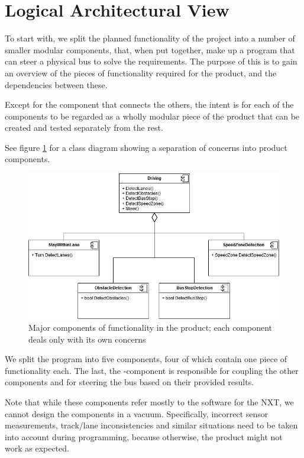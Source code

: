 \section{Logical Architectural View}

To start with, we split the planned functionality of the project into a number of smaller modular components, that, when put together, make up a program that can steer a physical bus to solve the requirements. The purpose of this is to gain an overview of the pieces of functionality required for the product, and the dependencies between these. 

Except for the component that connects the others, the intent is for each of the components to be regarded as a wholly modular piece of the product that can be created and tested separately from the rest. 

See figure \ref{fig:components} for a class diagram showing a separation of concerns into product components. 

\begin{figure}[ht]
    \includegraphics[width=\textwidth]{Images/Design/componentDiagram.png}
    \caption{Major components of functionality in the product; each component deals only with its own concerns}
    \label{fig:components}
\end{figure}

We split the program into five components, four of which contain one piece of functionality each. The last, the -component is responsible for coupling the other components and for steering the bus based on their provided results. 

Note that while these components refer mostly to the software for the NXT, we cannot design the components in a vacuum. Specifically, incorrect sensor measurements, track/lane inconsistencies and similar situations need to be taken into account during programming, because otherwise, the product might not work as expected. 

